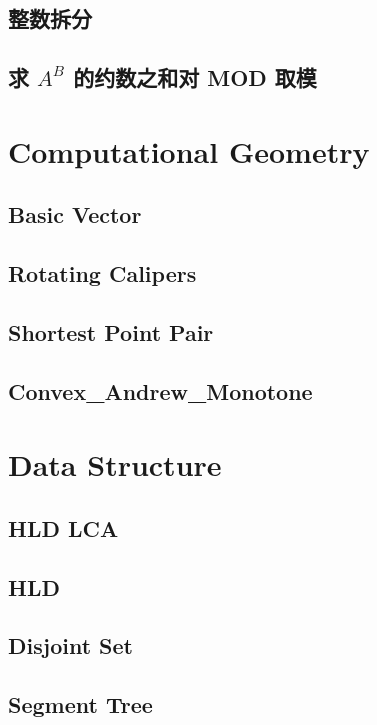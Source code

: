 	\subsection{整数拆分}
		
	\subsection{求 $A^B$ 的约数之和对 MOD 取模}
		
\section{Computational Geometry}
	\subsection{Basic Vector}
		
	\subsection{Rotating Calipers}
		
	\subsection{Shortest Point Pair}
		
	\subsection{Convex\_Andrew\_Monotone}
		
\section{Data Structure}
	\subsection{HLD LCA}
		
	\subsection{HLD}
		
	\subsection{Disjoint Set}
		
	\subsection{Segment Tree}
		
